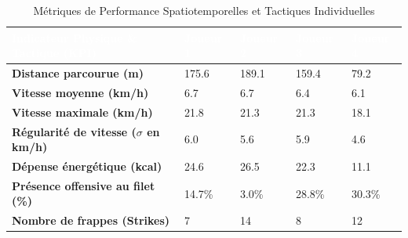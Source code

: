 \begin{table}[htbp]
  \centering
  \caption{Métriques de Performance Spatiotemporelles et Tactiques Individuelles}
  \label{tab:match_stats_players}
  \tablestyle
  \begin{tabularx}{\textwidth}{X C{2.2cm} C{2.2cm} C{2.2cm} C{2.2cm}}
    \toprule
    \textcolor{white}{\textbf{Indicateur Physique \& Tactique (KPI)}} & 
    \textcolor{white}{\textbf{Joueur 1}} & 
    \textcolor{white}{\textbf{Joueur 2}} & 
    \textcolor{white}{\textbf{Joueur 3}} & 
    \textcolor{white}{\textbf{Joueur 4}} \\
    \midrule
    \textbf{Distance parcourue (m)} & 175.6 & 189.1 & 159.4 & 79.2 \\
    \textbf{Vitesse moyenne (km/h)} & 6.7 & 6.7 & 6.4 & 6.1 \\
    \textbf{Vitesse maximale (km/h)} & 21.8 & 21.3 & 21.3 & 18.1 \\
    \textbf{Régularité de vitesse ($\sigma$ en km/h)} & 6.0 & 5.6 & 5.9 & 4.6 \\
    \textbf{Dépense énergétique (kcal)} & 24.6 & 26.5 & 22.3 & 11.1 \\
    \textbf{Présence offensive au filet (\%)} & 14.7\% & 3.0\% & 28.8\% & 30.3\% \\
    \textbf{Nombre de frappes (Strikes)} & 7 & 14 & 8 & 12 \\
    \bottomrule
  \end{tabularx}
\end{table}
